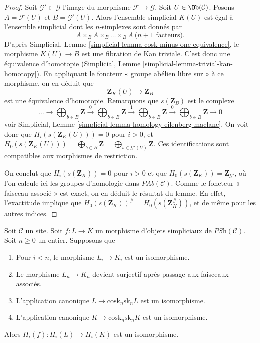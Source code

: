 \begin{proof}
Soit $\mathcal{G}' \subset \mathcal{G}$ l'image du
morphisme $\mathcal{F} \to \mathcal{G}$.
Soit $U \in \Ob(\mathcal{C})$. Posons
$A = \mathcal{F}(U)$ et $B = \mathcal{G}'(U)$.
Alors l'ensemble simplicial $K(U)$ est égal à l'ensemble
simplicial dont les $n$-simplexes sont donnés par
$$
A \times_B A \times_B \ldots \times_B A\ (n + 1 \text{ facteurs)}.
$$
D'après Simplicial, Lemme \ref{simplicial-lemma-cosk-minus-one-equivalence},
le morphisme $K(U) \to B$ est une fibration de Kan triviale.
C'est donc une équivalence d'homotopie
(Simplicial, Lemme \ref{simplicial-lemma-trivial-kan-homotopy}).
En appliquant le foncteur « groupe abélien libre sur » à ce morphisme,
on en déduit que
$$
\mathbf{Z}_K(U) \longrightarrow \mathbf{Z}_B
$$
est une équivalence d'homotopie. Remarquons que $s(\mathbf{Z}_B)$ est
le complexe
$$
\ldots \to
\bigoplus\nolimits_{b \in B}\mathbf{Z} \xrightarrow{0}
\bigoplus\nolimits_{b \in B}\mathbf{Z} \xrightarrow{1}
\bigoplus\nolimits_{b \in B}\mathbf{Z} \xrightarrow{0}
\bigoplus\nolimits_{b \in B}\mathbf{Z} \to 0
$$
voir Simplicial, Lemme \ref{simplicial-lemma-homology-eilenberg-maclane}.
On voit donc que
$H_i(s(\mathbf{Z}_K(U))) = 0$ pour $i > 0$, et
$H_0(s(\mathbf{Z}_K(U))) = \bigoplus_{b \in B}\mathbf{Z}
= \bigoplus_{s \in \mathcal{G}'(U)} \mathbf{Z}$.
Ces identifications sont compatibles aux morphismes de
restriction.

\medskip\noindent
On conclut que $H_i(s(\mathbf{Z}_K)) = 0$ pour $i > 0$ et que
$H_0(s(\mathbf{Z}_K)) = \mathbf{Z}_{\mathcal{G}'}$, où l'on
calcule ici les groupes d'homologie dans $\textit{PAb}(\mathcal{C})$. Comme
le foncteur « faisceau associé » est exact, on en déduit le résultat
du lemme. En effet, l'exactitude implique
que $H_0(s(\mathbf{Z}_K))^\# = H_0(s(\mathbf{Z}_K^\#))$,
et de même pour les autres indices.
\end{proof}

\begin{lemma}
\label{lemma-acyclicity}
Soit $\mathcal{C}$ un site.
Soit $f : L \to K$ un morphisme d'objets
simpliciaux de $\textit{PSh}(\mathcal{C})$.
Soit $n \geq 0$ un entier.
Supposons que
\begin{enumerate}
\item Pour $i < n$, le morphisme $L_i \to K_i$ est un isomorphisme.
\item Le morphisme $L_n \to K_n$ devient surjectif après passage aux faisceaux associés.
\item L'application canonique $L \to \text{cosk}_n \text{sk}_n L$ est un isomorphisme.
\item L'application canonique $K \to \text{cosk}_n \text{sk}_n K$ est un isomorphisme.
\end{enumerate}
Alors $H_i(f) : H_i(L) \to H_i(K)$ est un isomorphisme.
\end{lemma}

